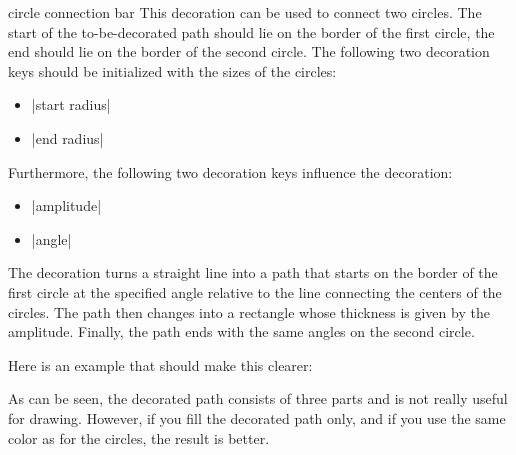 \begin{decoration}{circle connection bar}
    This decoration can be used to connect two circles. The start of the
    to-be-decorated path should lie on the border of the first circle, the end
    should lie on the border of the second circle. The following two decoration
    keys should be initialized with the sizes of the circles:
    \begin{itemize}
        \item |start radius|
        \item |end radius|
    \end{itemize}
    Furthermore, the following two decoration keys influence the decoration:
    \begin{itemize}
        \item |amplitude|
        \item |angle|
    \end{itemize}
    The decoration turns a straight line into a path that starts on the border
    of the first circle at the specified angle relative to the line connecting
    the centers of the circles. The path then changes into a rectangle whose
    thickness is given by the amplitude. Finally, the path ends with the same
    angles on the second circle.

    Here is an example that should make this clearer:
\begin{codeexample}[preamble={\usetikzlibrary{mindmap}}]
\end{codeexample}

    As can be seen, the decorated path consists of three parts and is not
    really useful for drawing. However, if you fill the decorated path only,
    and if you use the same color as for the circles, the result is better.
\begin{codeexample}[preamble={\usetikzlibrary{mindmap}}]
\end{codeexample}
\end{decoration}
